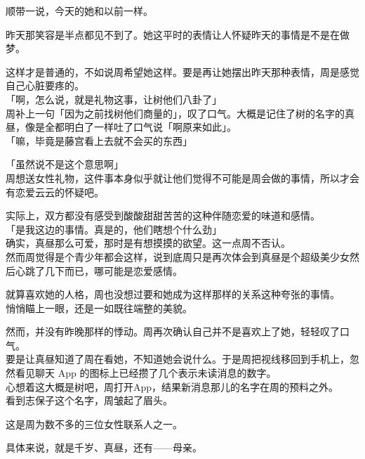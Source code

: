 顺带一说，今天的她和以前一样。

昨天那笑容是半点都见不到了。她这平时的表情让人怀疑昨天的事情是不是在做梦。

这样才是普通的，不如说周希望她这样。要是再让她摆出昨天那种表情，周是感觉自己心脏要疼的。\\

「啊，怎么说，就是礼物这事，让树他们八卦了」\\

周补上一句「因为之前找树他们商量的」，叹了口气。大概是记住了树的名字的真昼，像是全都明白了一样吐了口气说「啊原来如此」。\\

「嘛，毕竟是藤宫看上去就不会买的东西」

「虽然说不是这个意思啊」\\

周想送女性礼物，这件事本身似乎就让他们觉得不可能是周会做的事情，所以才会有恋爱云云的怀疑吧。

实际上，双方都没有感受到酸酸甜甜苦苦的这种伴随恋爱的味道和感情。\\

「是我这边的事情。真是的，他们瞎想个什么劲」\\

确实，真昼那么可爱，那时是有想摸摸的欲望。这一点周不否认。\\

然而周觉得是个青少年都会这样，说到底周只是再次体会到真昼是个超级美少女然后心跳了几下而已，哪可能是恋爱感情。

就算喜欢她的人格，周也没想过要和她成为这样那样的关系这种夸张的事情。\\

悄悄瞄上一眼，还是一如既往端整的美貌。

然而，并没有昨晚那样的悸动。周再次确认自己并不是喜欢上了她，轻轻叹了口气。\\

要是让真昼知道了周在看她，不知道她会说什么。于是周把视线移回到手机上，忽然看见聊天 App 的图标上已经攒了几个表示未读消息的数字。\\

心想着这大概是树吧，周打开App，结果新消息那儿的名字在周的预料之外。\\

看到志保子这个名字，周皱起了眉头。

这是周为数不多的三位女性联系人之一。

具体来说，就是千岁、真昼，还有——母亲。\\

